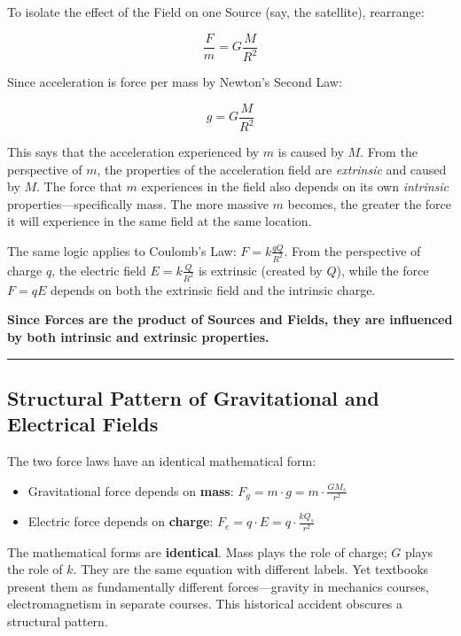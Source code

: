 \documentclass[
  letterpaper,
  DIV=11,
  numbers=noendperiod]{scrartcl}
\providecommand{\tightlist}{%
  \setlength{\itemsep}{0pt}\setlength{\parskip}{0pt}}
\begin{document}
To isolate the effect of the Field on one Source (say, the satellite),
rearrange:

\[\frac{F}{m} = G\frac{M}{R^2}\]

Since acceleration is force per mass by Newton's Second Law:

\[g = G\frac{M}{R^2}\]

This says that the acceleration experienced by \(m\) is caused by \(M\).
From the perspective of \(m\), the properties of the acceleration field
are \emph{extrinsic} and caused by \(M\). The force that \(m\)
experiences in the field also depends on its own \emph{intrinsic}
properties---specifically mass. The more massive \(m\) becomes, the
greater the force it will experience in the same field at the same
location.

The same logic applies to Coulomb's Law: \(F = k\frac{qQ}{R^2}\). From
the perspective of charge \(q\), the electric field
\(E = k\frac{Q}{R^2}\) is extrinsic (created by \(Q\)), while the force
\(F = qE\) depends on both the extrinsic field and the intrinsic charge.

\textbf{Since Forces are the product of Sources and Fields, they are
influenced by both intrinsic and extrinsic properties.}

\begin{center}\rule{0.5\linewidth}{0.5pt}\end{center}

\subsection{Structural Pattern of Gravitational and Electrical
Fields}\label{structural-pattern-of-gravitational-and-electrical-fields}

The two force laws have an identical mathematical form:

\begin{itemize}
\tightlist
\item
  Gravitational force depends on \textbf{mass}:
  \(F_g = m \cdot g = m \cdot \frac{GM_s}{r^2}\)
\item
  Electric force depends on \textbf{charge}:
  \(F_e = q \cdot E = q \cdot \frac{kQ_s}{r^2}\)
\end{itemize}

The mathematical forms are \textbf{identical}. Mass plays the role of
charge; \(G\) plays the role of \(k\). They are the same equation with
different labels. Yet textbooks present them as fundamentally different
forces---gravity in mechanics courses, electromagnetism in separate
courses. This historical accident obscures a structural pattern.
\end{document}

